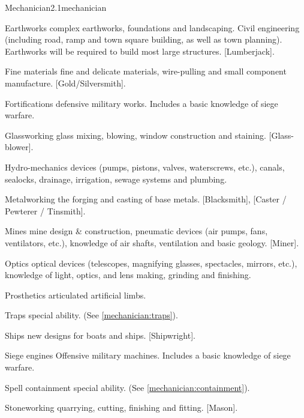 \begin{skill}{Mechanician}{2.1}{mechanician}
\begin{Description}
\item[Earthworks]
complex earthworks, foundations and landscaping. Civil engineering
(including road, ramp and town square building, as well as town
planning). Earthworks will be required to build most large
structures. [Lumberjack].

\item[Fine materials]
fine and delicate materials, wire-pulling and small component
manufacture. [Gold/Silversmith].

\item[Fortifications]
defensive military works. Includes a basic knowledge of siege warfare.

\item[Glassworking]
glass mixing, blowing, window construction and staining.
[Glass-blower].

\item[Hydro-mechanics]
devices (pumps, pistons, valves, waterscrews, etc.), canals, sealocks,
drainage, irrigation, sewage systems and plumbing.

\item[Metalworking]
the forging and casting of base metals. [Blacksmith], [Caster /
Pewterer / Tinsmith].

\item[Mines]
mine design \& construction, pneumatic devices (air pumps, fans,
ventilators, etc.), knowledge of air shafts, ventilation and basic
geology.  [Miner].

\item[Optics]
optical devices (telescopes, magnifying glasses, spectacles, mirrors,
etc.), knowledge of light, optics, and lens making, grinding and
finishing.

\item[Prosthetics]
articulated artificial limbs.

\item[Traps]
special ability. (See \ref{mechanician:traps}).

\item[Ships]
new designs for boats and ships. [Shipwright].

\item[Siege engines]
Offensive military machines. Includes a basic knowledge of siege
warfare.

\item[Spell containment]
special ability. (See \ref{mechanician:containment}).

\item[Stoneworking]
quarrying, cutting, finishing and fitting. [Mason].


\end{Description}
\end{skill}

